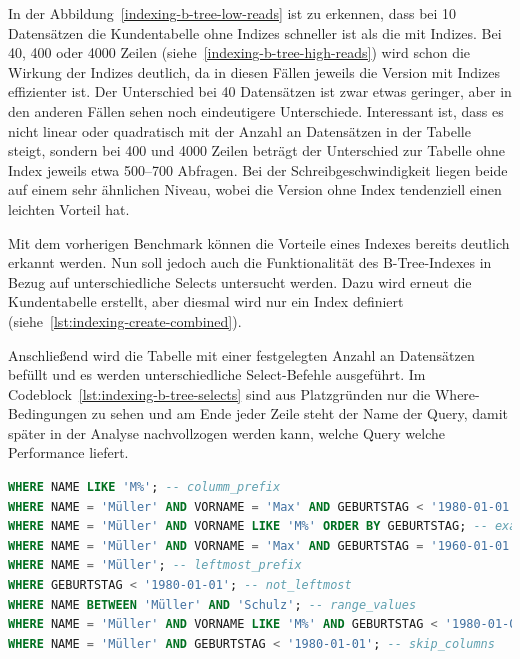 In der Abbildung~\ref{indexing-b-tree-low-reads} ist zu erkennen, dass bei 10 Datensätzen die Kundentabelle ohne Indizes schneller ist als die mit Indizes.
Bei 40, 400 oder 4000 Zeilen (siehe~\ref{indexing-b-tree-high-reads}) wird schon die Wirkung der Indizes deutlich, da in diesen Fällen jeweils die Version mit Indizes effizienter ist.
Der Unterschied bei 40 Datensätzen ist zwar etwas geringer, aber in den anderen Fällen sehen noch eindeutigere Unterschiede.
Interessant ist, dass es nicht linear oder quadratisch mit der Anzahl an Datensätzen in der Tabelle steigt, sondern bei 400 und 4000 Zeilen beträgt der Unterschied zur Tabelle ohne Index jeweils etwa 500--700 Abfragen.
Bei der Schreibgeschwindigkeit liegen beide auf einem sehr ähnlichen Niveau, wobei die Version ohne Index tendenziell einen leichten Vorteil hat.

Mit dem vorherigen Benchmark können die Vorteile eines Indexes bereits deutlich erkannt werden.
Nun soll jedoch auch die Funktionalität des B-Tree-Indexes in Bezug auf unterschiedliche Selects untersucht werden.
Dazu wird erneut die Kundentabelle erstellt, aber diesmal wird nur ein Index definiert (siehe~\ref{lst:indexing-create-combined}).

Anschließend wird die Tabelle mit einer festgelegten Anzahl an Datensätzen befüllt und es werden unterschiedliche Select-Befehle ausgeführt.
Im Codeblock~\ref{lst:indexing-b-tree-selects} sind aus Platzgründen nur die Where-Bedingungen zu sehen und am Ende jeder Zeile steht der Name der Query, damit später in der Analyse nachvollzogen werden kann, welche Query welche Performance liefert.

\newpage
\begin{lstlisting}[language=SQL,caption=Unterschiedliche Where-Bedingungen für B-Tree-Index,label={lst:indexing-b-tree-selects},basicstyle=\ttfamily\scriptsize]
WHERE NAME LIKE 'M%'; -- columm_prefix
WHERE NAME = 'Müller' AND VORNAME = 'Max' AND GEBURTSTAG < '1980-01-01'; -- combined_match_with_range
WHERE NAME = 'Müller' AND VORNAME LIKE 'M%' ORDER BY GEBURTSTAG; -- exact_with_prefix
WHERE NAME = 'Müller' AND VORNAME = 'Max' AND GEBURTSTAG = '1960-01-01'; -- full_match
WHERE NAME = 'Müller'; -- leftmost_prefix
WHERE GEBURTSTAG < '1980-01-01'; -- not_leftmost
WHERE NAME BETWEEN 'Müller' AND 'Schulz'; -- range_values
WHERE NAME = 'Müller' AND VORNAME LIKE 'M%' AND GEBURTSTAG < '1980-01-01'; -- range_with_like
WHERE NAME = 'Müller' AND GEBURTSTAG < '1980-01-01'; -- skip_columns
\end{lstlisting}
\vspace{-5pt}

